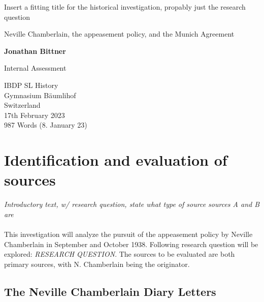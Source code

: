 \documentclass[10pt, a4papert, hidelinks]{article}
\begin{document}
\begin{titlepage}
	\begin{center}
		\vspace*{1cm}
 
		Insert a fitting title for the historical investigation, propably just the research question
 
		\vspace{0.5cm}
		Neville Chamberlain, the appeasement policy, and the Munich Agreement
			 
		\vspace{1.5cm}
 
		\textbf{Jonathan Bittner}
 
		\vfill
			 
		Internal Assessment
			 
		\vspace{0.8cm}
	  
			 
		IBDP SL History\\
		Gymnasium Bäumlihof\\
		Switzerland\\
		17th February 2023\\
		987 Words (8. January 23)
			 
	\end{center}
 \end{titlepage}

\tableofcontents
\newpage

\section{Identification and evaluation of sources}


\emph{Introductory text, w/ research question, state what type of source sources A and B are}\\\\
This investigation will analyze the pursuit of the appeasement policy by Neville Chamberlain in September and October 1938. Following research question will be explored: \emph{RESEARCH QUESTION}. The sources to be evaluated are both primary sources, with N. Chamberlain being the originator.

\subsection{The Neville Chamberlain Diary Letters}
\end{document}
